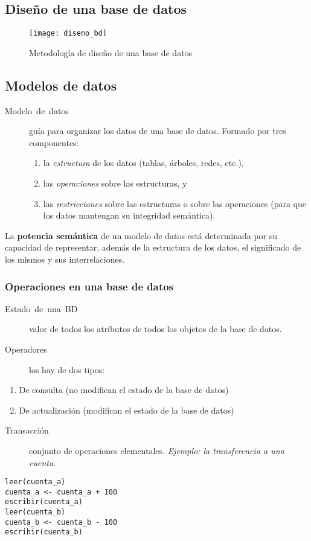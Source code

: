 \documentclass[a4paper, twoside]{article}
\begin{document}
\subsection{Diseño de una base de datos}

\noindent \begin{center}
\begin{figure}[H]
\noindent \centering{}\texttt{[image: diseno\_bd]}\protect\caption{Metodología de diseño de una base de datos}
\end{figure}

\par\end{center}


\subsection{Modelos de datos}
\begin{description}
\item [{Modelo~de~datos}] guía para organizar los datos de una base de
datos. Formado por tres componentes: 

\begin{enumerate}
\item la \emph{estructura} de los datos (tablas, árboles, redes, etc.),
\item las \emph{operaciones} sobre las estructuras, y
\item las \emph{restricciones} sobre las estructuras o sobre las operaciones
(para que los datos mantengan su integridad semántica).
\end{enumerate}
\end{description}
La \textbf{potencia semántica} de un modelo de datos está determinada
por su capacidad de representar, además de la estructura de los datos,
el significado de los mismos y sus interrelaciones.


\subsubsection{Operaciones en una base de datos}
\begin{description}
\item [{Estado~de~una~BD}] valor de todos los atributos de todos los
objetos de la base de datos.
\item [{Operadores}] los hay de dos tipos:\end{description}
\begin{enumerate}
\item De consulta (no modifican el estado de la base de datos)
\item De actualización (modifican el estado de la base de datos)\end{enumerate}
\begin{description}
\item [{Transacción}] conjunto de operaciones elementales. \emph{Ejemplo:
la transferencia a una cuenta.}
\end{description}
\begin{lstlisting}
leer(cuenta_a)
cuenta_a <- cuenta_a + 100
escribir(cuenta_a)
leer(cuenta_b)
cuenta_b <- cuenta_b - 100
escribir(cuenta_b)
\end{lstlisting}
\end{document}
